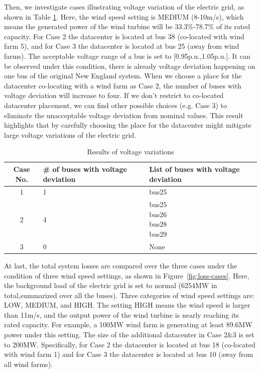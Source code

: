 Then, we investigate cases illustrating voltage variation of the electric grid, as shown in Table \ref{tab:results-volvio}. Here, the wind speed setting is MEDIUM (8-10m/s), which means the generated power of the wind turbine will be 33.3\%-78.7\% of its rated capacity. For Case 2 the datacenter is located at bus 38 (co-located with wind farm 5), and for Case 3 the datacenter is located at bus 25 (away from wind farms). The acceptable voltage range of a bus is set to [0.95p.u.,1.05p.u.]. It can be observed under this condition, there is already voltage deviation happening on one bus of the original New England system. When we choose a place for the datacenter co-locating with a wind farm as Case 2, the number of buses with voltage deviation will increase to four. If we don't restrict to co-located datacenter placement, we can find other possible choices (e.g. Case 3) to eliminate the unacceptable voltage deviation from nominal values. This result highlights that by carefully choosing the place for the datacenter might mitigate large voltage variations of the electric grid.

\begin{table}[ht]
\begin{center}
\caption{Results of voltage variations}
\begin{tabular}{|c|p{1in}|p{1in}|}
\hline
Case No. & \# of buses with voltage deviation & List of buses with voltage deviation  \\
\hline
1 & 1 & bus25\\
\hline
2 & 4 & \tabincell{c}{bus25\\bus26\\bus28\\bus29}\\
\hline
3 & 0 & None \\

\hline

\end{tabular}
   \vspace{.05in}
\label{tab:results-volvio}
\end{center}
\end{table}

At last, the total system losses are compared over the three cases under the condition of three wind speed settings, as shown in Figure~\ref{fig:loss-cases}. Here, the background load of the electric grid is set to normal (6254MW in total,summarized over all the buses). Three categories of wind speed settings are: LOW, MEDIUM, and HIGH. The setting HIGH means the wind speed is larger than 11m/s, and the output power of the wind turbine is nearly reaching its rated capacity. For example, a 100MW wind farm is generating at least 89.6MW power under this setting. The size of the additional datacenter in Case 2\&3 is set to 200MW. Specifically, for Case 2 the datacenter is located at bus 18 (co-located with wind farm 1) and for Case 3 the datacenter is located at bus 10 (away from all wind farms).

